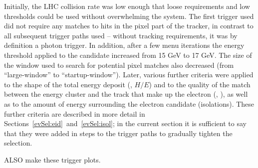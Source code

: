 Initially, the LHC collision rate was low enough that loose 
requirements and low thresholds could be used without 
overwhelming the system.  
The first trigger used did not require any matches to 
hits in the pixel part of the tracker, 
in contrast to all subsequent trigger paths used -- 
without tracking requirements, it was by definition a 
photon trigger.  
In addition, after a few menu iterations 
the energy threshold applied to the candidate 
increased from 15 GeV to 17 GeV.  
The size of the window used to search for potential pixel 
matches also decreased (from ``large-window'' to ``startup-window'').%
Later, various further criteria were applied to 
the shape of the total energy deposit (\sieie, $H/E$) and 
to the quality of the match between the energy cluster and the track 
that make up the electron (\detain, \dphiin), 
as well as to the amount of energy surrounding 
the electron candidate (isolations).  
These further criteria are described in more detail in 
Sections~\ref{evSel:eid}~and~\ref{evSel:isol}; 
in the current section it is sufficient to say that they 
were added in steps to the trigger paths to gradually tighten the 
selection.  



ALSO make these trigger plots.  












